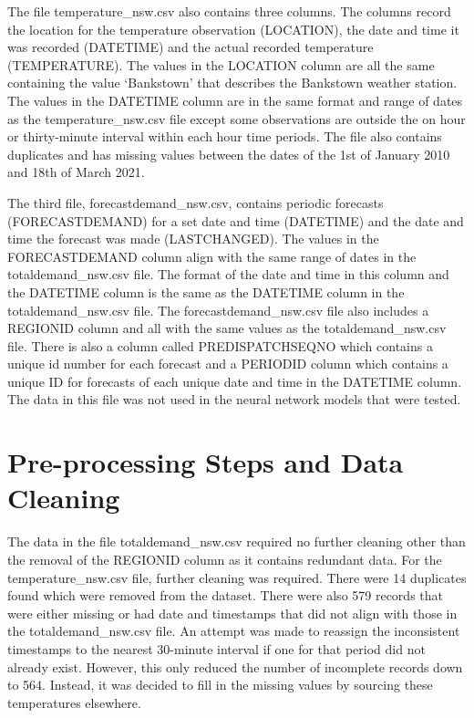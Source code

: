 \documentclass[mstat,12pt]{unswthesis}
\begin{document}
\bigskip

The file temperature\_nsw.csv also contains three columns. The columns
record the location for the temperature observation (LOCATION), the date
and time it was recorded (DATETIME) and the actual recorded temperature
(TEMPERATURE). The values in the LOCATION column are all the same
containing the value `Bankstown' that describes the Bankstown weather
station. The values in the DATETIME column are in the same format and
range of dates as the temperature\_nsw.csv file except some observations
are outside the on hour or thirty-minute interval within each hour time
periods. The file also contains duplicates and has missing values
between the dates of the 1st of January 2010 and 18th of March 2021.

\bigskip

The third file, forecastdemand\_nsw.csv, contains periodic forecasts
(FORECASTDEMAND) for a set date and time (DATETIME) and the date and
time the forecast was made (LASTCHANGED). The values in the
FORECASTDEMAND column align with the same range of dates in the
totaldemand\_nsw.csv file. The format of the date and time in this
column and the DATETIME column is the same as the DATETIME column in the
totaldemand\_nsw.csv file. The forecastdemand\_nsw.csv file also
includes a REGIONID column and all with the same values as the
totaldemand\_nsw.csv file. There is also a column called
PREDISPATCHSEQNO which contains a unique id number for each forecast and
a PERIODID column which contains a unique ID for forecasts of each
unique date and time in the DATETIME column. The data in this file was
not used in the neural network models that were tested.

\hypertarget{pre-processing-steps-and-data-cleaning}{%
\section{Pre-processing Steps and Data
Cleaning}\label{pre-processing-steps-and-data-cleaning}}

The data in the file totaldemand\_nsw.csv required no further cleaning
other than the removal of the REGIONID column as it contains redundant
data. For the temperature\_nsw.csv file, further cleaning was required.
There were 14 duplicates found which were removed from the dataset.
There were also 579 records that were either missing or had date and
timestamps that did not align with those in the totaldemand\_nsw.csv
file. An attempt was made to reassign the inconsistent timestamps to the
nearest 30-minute interval if one for that period did not already exist.
However, this only reduced the number of incomplete records down to 564.
Instead, it was decided to fill in the missing values by sourcing these
temperatures elsewhere.
\end{document}
